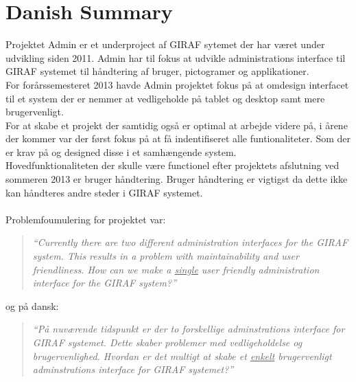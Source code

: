 \chapter*{Danish Summary}
Projektet Admin er et underproject af GIRAF sytemet der har været under udvikling siden 2011. Admin har til fokus at udvikle administrations interface til GIRAF systemet til håndtering af bruger, pictogramer og applikationer.\\
For forårssemesteret 2013 havde Admin projektet fokus på at omdesign interfacet til et system der er nemmer at vedligeholde på tablet og desktop samt mere brugervenligt.\\
For at skabe et projekt der samtidig også er optimal at arbejde videre på, i årene der kommer var der først fokus på at få indentifiseret alle funtionaliteter. Som der er krav på og designed disse i et samhængende system.\\
Hovedfunktionaliteten der skulle være functionel efter projektets afslutning ved sommeren 2013 er bruger håndtering.   
Bruger håndtering er vigtigst da dette ikke kan håndteres andre steder i GIRAF systemet.\\
\\
Problemfoumulering for projektet var: 
\begin{verse}
\textit{``Currently there are two different administration interfaces for the GIRAF system.
This results in a problem with maintainability and user friendliness.
How can we make a \underline{single} user friendly administration interface for the GIRAF system?''}
\end{verse}

og på dansk: 
\begin{verse}
\textit{``På nuværende tidspunkt er der to forskellige adminstrations interface for GIRAF systemet.
Dette skaber problemer med vedligeholdelse og brugervenlighed. 
Hvordan er det multigt at skabe et \underline{enkelt} brugervenligt adminstrations interface for GIRAF systemet?''}
\end{verse}


